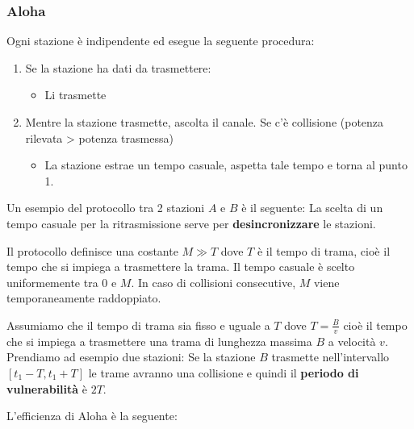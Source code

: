 \documentclass[a4paper]{article}
\begin{document}
\subsubsection{Aloha}
Ogni stazione è indipendente ed esegue la seguente procedura:
\begin{enumerate}
  \item Se la stazione ha dati da trasmettere:
    \begin{itemize}
      \item Li trasmette
    \end{itemize}

  \item Mentre la stazione trasmette, ascolta il canale. 
    Se c'è collisione (potenza rilevata > potenza trasmessa)
    \begin{itemize}
      \item La stazione estrae un tempo casuale, aspetta tale tempo e torna
        al punto 1.
    \end{itemize}
\end{enumerate}

\begin{example}
  Un esempio del protocollo tra 2 stazioni \( A \) e \( B \) è il seguente:
  \label{03-12-D2}
  \noindent
  La scelta di un tempo casuale per la ritrasmissione serve per \textbf{desincronizzare}
  le stazioni.

\end{example}
Il protocollo definisce una costante \( M \gg T \) dove \( T \) è il tempo di trama,
cioè il tempo che si impiega a trasmettere la trama. Il tempo casuale è scelto 
uniformemente tra 0 e \( M \). In caso di collisioni consecutive, \( M \) viene
temporaneamente raddoppiato.

\vspace{1em}
\noindent
Assumiamo che il tempo di trama sia fisso e uguale a \( T \) dove \( T = \frac{B}{v} \)
cioè il tempo che si impiega a trasmettere una trama di lunghezza massima \( B \) a velocità
\( v \).
Prendiamo ad esempio due stazioni:
\label{04-12-D1}
Se la stazione \( B \) trasmette nell'intervallo \( [t_1 - T,t_1 + T] \) 
le trame avranno una collisione e quindi il \textbf{periodo di vulnerabilità} è \( 2T \).

\vspace{1em}
\noindent
L'efficienza di Aloha è la seguente:
\label{04-12-D2}
\end{document}
